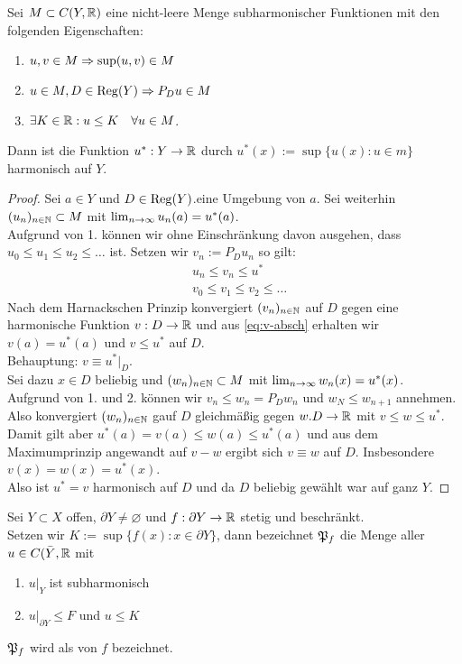 \begin{lemma}[Perron]
  \label{lemma:perron}
  Sei $M \subset C(Y, \mathbb{R})$ eine nicht-leere Menge subharmonischer
  Funktionen mit den folgenden Eigenschaften:
  \begin{enumerate}
  \item $u,v \in M \Rightarrow \sup(u,v) \in M$
  \item $u \in M, D \in \operatorname{Reg}(Y) \Rightarrow P_Du \in M$
  \item $\exists K \in \mathbb{R}: u \leq K \quad \forall u \in M$.
  \end{enumerate}
  Dann ist die Funktion $u^\ast : Y \rightarrow \mathbb{R}$ durch $u^\ast(x) :=
  \sup\{u(x) : u \in m \}$ harmonisch auf $Y$.
\end{lemma}

\begin{proof}
  Sei $a \in Y$ und $D \in \operatorname{Reg}(Y)$.eine Umgebung von $a$. Sei
  weiterhin $(u_n)_{n \in \mathbb{N}} \subset M$ mit $\lim_{n \rightarrow \infty}
  u_n(a) = u^\ast(a)$. \\
  Aufgrund von 1. können wir ohne Einschränkung davon ausgehen, dass
  $u_0 \leq u_1 \leq u_2 \leq \dots$ ist. Setzen wir $v_n := P_D u_n$ so gilt:
  \begin{align*}
   & u_n \leq v_n \leq u^\ast \label{eq:v-absch} \tag{1}\\
   & v_0 \leq v_1 \leq v_2 \leq \dots
  \end{align*}
  Nach dem Harnackschen Prinzip konvergiert $(v_n)_{n \in \mathbb{N}}$ auf $D$
  gegen eine harmonische Funktion $v: D \rightarrow \mathbb{R}$ und aus
  \eqref{eq:v-absch} erhalten wir $v(a) = u^\ast(a)$ und $v \leq
  u^\ast$ auf $D$. \\
  Behauptung: $v \equiv u^\ast|_D$. \\
  Sei dazu $x \in D$ beliebig und $(w_n)_{n\in \mathbb{N}}\subset M$ mit
  $\lim_{n \rightarrow \infty}w_n(x) = u^\ast(x)$. \\
  Aufgrund von 1. und 2. können wir $v_n \leq w_n = P_D w_n$ und $w_N
  \leq w_{n+1}$ annehmen. Also konvergiert $(w_n)_{n \in \mathbb{N}}$ gauf $D$
  gleichmäßig gegen $w. D \rightarrow \mathbb{R}$ mit $v \leq w \leq u^\ast$. \\
  Damit gilt aber $u^\ast(a) = v(a) \leq w(a) \leq u^\ast(a)$ und aus
  dem Maximumprinzip angewandt auf $v-w$ ergibt sich $v \equiv w$ auf
  $D$. Insbesondere $v(x) = w(x) = u^\ast(x)$. \\
  Also ist $u^\ast = v$ harmonisch auf $D$ und da $D$ beliebig gewählt
  war auf ganz $Y$.
\end{proof}

\begin{defin}
  Sei $Y \subset X$ offen, $\partial Y \neq \varnothing$ und
  $f: \partial Y \rightarrow \mathbb{R}$ stetig und beschränkt. \\
  Setzen wir $K := \sup\{f(x) : x \in \partial Y\}$, dann bezeichnet
  $\mathfrak{P}_f$ die Menge aller $u \in C(\bar Y, \mathbb{R}$ mit
  \begin{enumerate}
  \item $u|_Y$ ist subharmonisch
  \item $u|_{\partial Y} \leq F$ und $u \leq K$
  \end{enumerate}
  $\mathfrak{P}_f$ wird als  von $f$ bezeichnet.
\end{defin}


